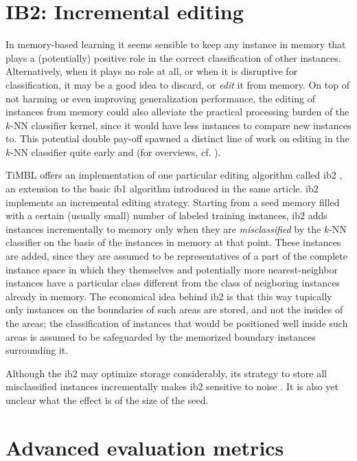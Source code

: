 \documentclass{report}
\begin{document}
\section{IB2: Incremental editing}
\label{ib2}

In memory-based learning it seems sensible to keep any instance in
memory that plays a (potentially) positive role in the correct
classification of other instances. Alternatively, when it plays no
role at all, or when it is disruptive for classification, it may be a
good idea to discard, or {\em edit} it from memory. On top of not
harming or even improving generalization performance, the editing of
instances from memory could also alleviate the practical processing
burden of the $k$-NN classifier kernel, since it would have less
instances to compare new instances to. This potential double pay-off
spawned a distinct line of work on editing in the $k$-NN classifier
quite early  and 
(for overviews, cf. ).

TiMBL offers an implementation of one particular editing algorithm
called {\sc ib2} \cite{Aha+91}, an extension to the basic {\sc ib1}
algorithm introduced in the same article. {\sc ib2} implements an
incremental editing strategy. Starting from a seed memory filled with
a certain (usually small) number of labeled training instances, {\sc
ib2} adds instances incrementally to memory only when they are {\em
misclassified}\/ by the $k$-NN classifier on the basis of the
instances in memory at that point. These instances are added, since
they are assumed to be representatives of a part of the complete
instance space in which they themselves and potentially more
nearest-neighbor instances have a particular class different from the
class of neigboring instances already in memory. The economical idea
behind {\sc ib2} is that this way tupically only instances on the
boundaries of such areas are stored, and not the insides of the areas;
the classification of instances that would be positioned well inside
such areas is assumed to be safeguarded by the memorized boundary
instances surrounding it.

Although the {\sc ib2} may optimize storage
considerably, its strategy to store all misclassified instances
incrementally makes {\sc ib2} sensitive to noise \cite{Aha+91}. It is
also yet unclear what the effect is of the size of the seed.

\section{Advanced evaluation metrics}
\label{advancedstats}
\end{document}
